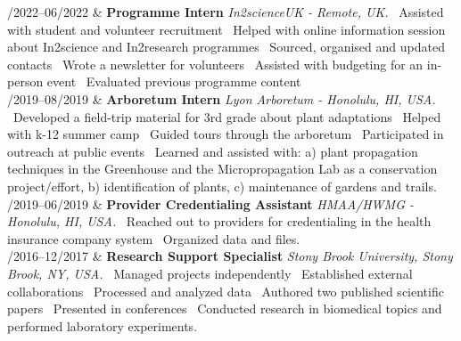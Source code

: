 \documentclass[11pt, a4paper]{article}
\newcommand{\Duration}[2]{\fontsize{10pt}{0}\selectfont #1--#2}
\begin{document}
\begin{EntriesTable}

	\Duration{01/2022}{06/2022}  &
	\textbf{Programme Intern}
	\newline
	\textit{In2scienceUK - Remote, UK.}
	\newline
	\textbullet \ Assisted with student and volunteer recruitment
	\textbullet \ Helped with online information session about In2science and In2research programmes
	\textbullet \ Sourced, organised and updated contacts
	\textbullet \ Wrote a newsletter for volunteers
	\textbullet \ Assisted with budgeting for an in-person event 
	\textbullet \ Evaluated previous programme content
	\\


	\Duration{06/2019}{08/2019}  &
	\textbf{Arboretum Intern}
	\newline
	\textit{Lyon Arboretum - Honolulu, HI, USA.}
	\newline
	\textbullet \ Developed a field-trip material for 3rd grade about plant adaptations
	\textbullet \ Helped with k-12 summer camp
	\textbullet \ Guided tours through the arboretum
	\textbullet \ Participated in outreach at public events
	\textbullet \ Learned and assisted with: a) plant propagation techniques in the Greenhouse and
	the Micropropagation Lab as a conservation project/effort, b) identification of plants, c)
	maintenance of gardens and trails.
	\\

	\Duration{03/2019}{06/2019}  &
	\textbf{Provider Credentialing Assistant}
	\newline
	\textit{HMAA/HWMG - Honolulu, HI, USA.}
	\newline
	\textbullet \ Reached out to providers for credentialing in the health insurance company system
	\textbullet \ Organized data and files.
	\\

	\Duration{08/2016}{12/2017}  &
	\textbf{Research Support Specialist}
	\newline
	\textit{Stony Brook University, Stony Brook, NY, USA.}
	\newline
	\textbullet \ Managed projects independently
	\textbullet \ Established external collaborations
	\textbullet \ Processed and analyzed data
	\textbullet \ Authored two published scientific papers
	\textbullet \ Presented in conferences
	\textbullet\ Conducted research in biomedical topics and performed laboratory experiments.
	\\

\end{EntriesTable}
\end{document}
